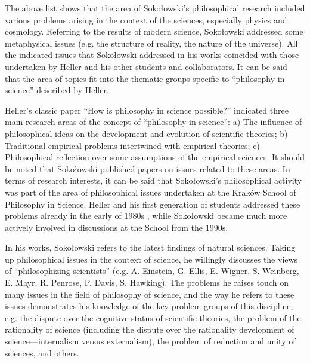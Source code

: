 \documentclass[%
  manuscript=article,
  year=2024,
  volume=77,
  doi=10.59203/zfn.77.689,
]{zfn}
\begin{document}
The above list shows that the area of Sokołowski's philosophical research included various problems arising in the context of the sciences, especially physics and cosmology. Referring to the results of modern science, Sokołowski addressed some metaphysical issues (e.g. the structure of reality, the nature of the universe). All the indicated issues that Sokołowski addressed in his works coincided with those undertaken by Heller and his other students and collaborators. It can be said that the area of topics fit into the thematic groups specific to ``philosophy in science'' described by Heller.



Heller's classic paper ``How is philosophy in science possible?'' 
\parencites[][]{Heller1986Jak}[][]{Heller2019How} %
 indicated three main research areas of the concept of ``philosophy in science'': a) The influence of philosophical ideas on the development and evolution of scientific theories; b) Traditional empirical problems intertwined with empirical theories; c) Philosophical reflection over some assumptions of the empirical sciences. It should be noted that Sokołowski published papers on issues related to these areas. In terms of research interests, it can be said that Sokołowski's philosophical activity was part of the area of philosophical issues undertaken at the Kraków School of Philosophy in Science. Heller and his first generation of students addressed these problems already in the early of 1980s 
\parencite[][p.222]{Trombik2021Koncepcje}, %
 while Sokołowski became much more actively involved in discussions at the School from the 1990s.



In his works, Sokołowski refers to the latest findings of natural sciences. Taking up philosophical issues in the context of science, he willingly discusses the views of ``philosophizing scientists'' (e.g. A. Einstein, G. Ellis, E. Wigner, S. Weinberg, E. Mayr, R. Penrose, P. Davis, S. Hawking). The problems he raises touch on many issues in the field of philosophy of science, and the way he refers to these issues demonstrates his knowledge of the key problem groups of this discipline, e.g. the dispute over the cognitive status of scientific theories, the problem of the rationality of science (including the dispute over the rationality development of science---internalism versus externalism), the problem of reduction and unity of sciences, and others.
\end{document}
